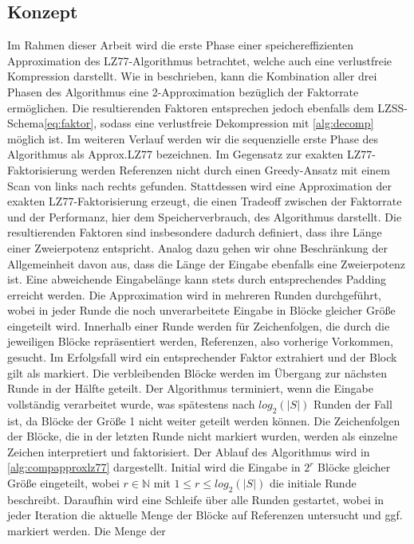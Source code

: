 \subsection{Konzept}
Im Rahmen dieser Arbeit wird die erste Phase einer speichereffizienten Approximation des LZ77-Algorithmus betrachtet, welche auch eine verlustfreie Kompression darstellt. 
Wie in \cite{ApproxLZ77} beschrieben, kann die Kombination aller drei Phasen des Algorithmus eine 2-Approximation bezüglich der Faktorrate ermöglichen. Die resultierenden 
Faktoren entsprechen jedoch ebenfalls dem LZSS-Schema\ref{eq:faktor}, sodass eine verlustfreie Dekompression mit \ref{alg:decomp} möglich ist. Im weiteren Verlauf werden wir 
die sequenzielle erste Phase des Algorithmus als Approx.LZ77 bezeichnen. Im Gegensatz zur exakten LZ77-Faktorisierung werden Referenzen nicht durch einen Greedy-Ansatz mit 
einem Scan von links nach rechts gefunden. Stattdessen wird eine Approximation der exakten LZ77-Faktorisierung erzeugt, die einen Tradeoff zwischen der Faktorrate und der Performanz,
hier dem Speicherverbrauch, des Algorithmus darstellt. Die resultierenden Faktoren sind insbesondere dadurch definiert, dass ihre Länge einer Zweierpotenz entspricht. Analog dazu 
gehen wir ohne Beschränkung der Allgemeinheit davon aus, dass die Länge der Eingabe ebenfalls eine Zweierpotenz ist. Eine abweichende Eingabelänge kann stets durch entsprechendes 
Padding erreicht werden. Die Approximation wird in mehreren Runden durchgeführt, wobei in jeder Runde die noch unverarbeitete Eingabe in Blöcke gleicher Größe eingeteilt wird. 
Innerhalb einer Runde werden für Zeichenfolgen, die durch die jeweiligen Blöcke repräsentiert werden, Referenzen, also vorherige Vorkommen, gesucht. Im Erfolgsfall wird ein 
entsprechender Faktor extrahiert und der Block gilt als markiert. Die verbleibenden Blöcke werden im Übergang zur nächsten Runde in der Hälfte geteilt. Der Algorithmus terminiert, 
wenn die Eingabe vollständig verarbeitet wurde, was spätestens nach $log_2(|S|)$ Runden der Fall ist, da Blöcke der Größe 1 nicht weiter geteilt werden können. Die Zeichenfolgen der 
Blöcke, die in der letzten Runde nicht markiert wurden, werden als einzelne Zeichen interpretiert und faktorisiert. Der Ablauf des Algorithmus wird in \ref{alg:compapproxlz77} dargestellt.
Initial wird die Eingabe in $2^r$ Blöcke gleicher Größe eingeteilt, wobei $r\in \mathbb{N}$ mit $1\leq r \leq log_2(|S|)$ die initiale Runde beschreibt.
Daraufhin wird eine Schleife über alle Runden gestartet, wobei in jeder Iteration die aktuelle Menge der Blöcke auf Referenzen untersucht und ggf. markiert werden. Die Menge der 

